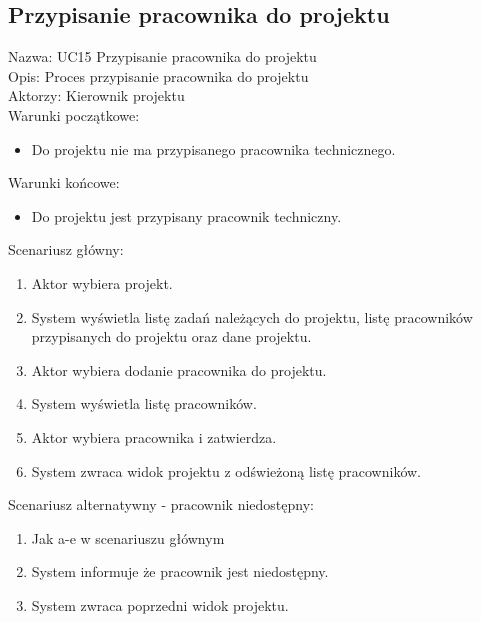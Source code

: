 \subsection{Przypisanie pracownika do projektu}
Nazwa: UC15 Przypisanie pracownika do projektu \\
Opis: Proces przypisanie pracownika do projektu \\
Aktorzy: Kierownik projektu \\
Warunki początkowe:
\begin{itemize}
\item Do projektu nie ma przypisanego pracownika technicznego.
\end{itemize}
Warunki końcowe:
\begin{itemize}
\item Do projektu jest przypisany pracownik techniczny.
\end{itemize}
Scenariusz główny:
\begin{enumerate}
\item Aktor wybiera projekt.
\item System wyświetla listę zadań należących do projektu, listę pracowników przypisanych do projektu oraz dane projektu.
\item Aktor wybiera dodanie pracownika do projektu.
\item System wyświetla listę pracowników.
\item Aktor wybiera pracownika i zatwierdza.
\item System zwraca widok projektu z odświeżoną listę pracowników.
\end{enumerate}
Scenariusz alternatywny - pracownik niedostępny: 
\begin{enumerate}
\item Jak a-e w scenariuszu głównym
\item System informuje że pracownik jest niedostępny.
\item System zwraca poprzedni widok projektu.
\end{enumerate}

